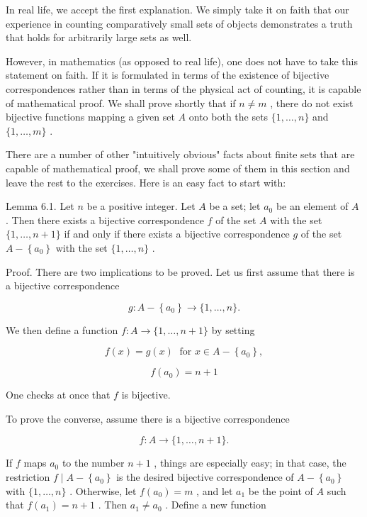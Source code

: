 In real life, we accept the first explanation. We simply take it on faith that our experience in counting comparatively small sets of objects demonstrates a truth that holds for arbitrarily large sets as well.

However, in mathematics (as opposed to real life), one does not have to take this statement on faith. If it is formulated in terms of the existence of bijective correspondences rather than in terms of the physical act of counting, it is capable of mathematical proof. We shall prove shortly that if \(n \neq  m\) , there do not exist bijective functions mapping a given set \(A\) onto both the sets \(\{ 1,\ldots ,n\}\) and \(\{ 1,\ldots ,m\}\) .

There are a number of other "intuitively obvious" facts about finite sets that are capable of mathematical proof, we shall prove some of them in this section and leave the rest to the exercises. Here is an easy fact to start with:

Lemma 6.1. Let \(n\) be a positive integer. Let \(A\) be a set; let \({a}_{0}\) be an element of \(A\) . Then there exists a bijective correspondence \(f\) of the set \(A\) with the set \(\{ 1,\ldots ,n + 1\}\) if and only if there exists a bijective correspondence \(g\) of the set \(A - \left\{  {a}_{0}\right\}\) with the set \(\{ 1,\ldots ,n\}\) .

Proof. There are two implications to be proved. Let us first assume that there is a bijective correspondence

\[
g : A - \left\{  {a}_{0}\right\}   \rightarrow  \{ 1,\ldots ,n\} .
\]

We then define a function \(f : A \rightarrow  \{ 1,\ldots ,n + 1\}\) by setting

\[
f\left( x\right)  = g\left( x\right) \;\text{ for }x \in  A - \left\{  {a}_{0}\right\}  ,
\]

\[
f\left( {a}_{0}\right)  = n + 1
\]

One checks at once that \(f\) is bijective.

To prove the converse, assume there is a bijective correspondence

\[
f : A \rightarrow  \{ 1,\ldots ,n + 1\} .
\]

If \(f\) maps \({a}_{0}\) to the number \(n + 1\) , things are especially easy; in that case, the restriction \(f \mid  A - \left\{  {a}_{0}\right\}\) is the desired bijective correspondence of \(A - \left\{  {a}_{0}\right\}\) with \(\{ 1,\ldots ,n\}\) . Otherwise, let \(f\left( {a}_{0}\right)  = m\) , and let \({a}_{1}\) be the point of \(A\) such that \(f\left( {a}_{1}\right)  = n + 1\) . Then \({a}_{1} \neq  {a}_{0}\) . Define a new function

